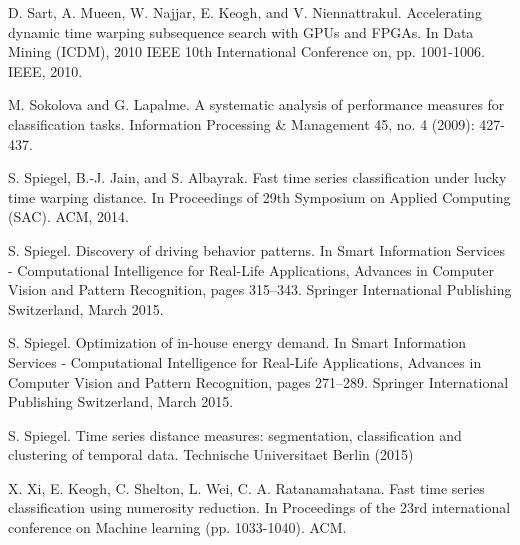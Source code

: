\begin{thebibliography}{2}
    D. Sart, A. Mueen, W. Najjar, E. Keogh, and V. Niennattrakul.
	Accelerating dynamic time warping subsequence search with GPUs and FPGAs. 
	In Data Mining (ICDM), 2010 IEEE 10th International Conference on, pp. 1001-1006. IEEE, 2010.

    M. Sokolova and G. Lapalme. 
    A systematic analysis of performance measures for classification tasks.
    Information Processing \& Management 45, no. 4 (2009): 427-437.
	
	S. Spiegel, B.-J. Jain, and S. Albayrak. 
	Fast time series classification under lucky time warping distance. 
	In Proceedings of 29th Symposium on Applied Computing (SAC). ACM, 2014.

	S. Spiegel. 
	Discovery of driving behavior patterns. 
	In Smart Information Services - Computational Intelligence for Real-Life Applications, Advances in Computer Vision and Pattern Recognition, pages 
	315–343. Springer International Publishing Switzerland, March 2015.
	
	S. Spiegel. 
	Optimization of in-house energy demand. 
	In Smart Information Services - Computational Intelligence for Real-Life Applications, Advances in Computer Vision and Pattern Recognition, pages 	
	271–289. Springer International Publishing Switzerland, March 2015.
	
	 S. Spiegel. 
	Time series distance measures: segmentation, classification and clustering of temporal data. 
	Technische Universitaet Berlin (2015)
	
	X. Xi, E. Keogh, C. Shelton, L. Wei, C. A. Ratanamahatana.
	Fast time series classification using numerosity reduction. 
	In Proceedings of the 23rd international conference on Machine learning (pp. 1033-1040). ACM.           
	
\end{thebibliography}

